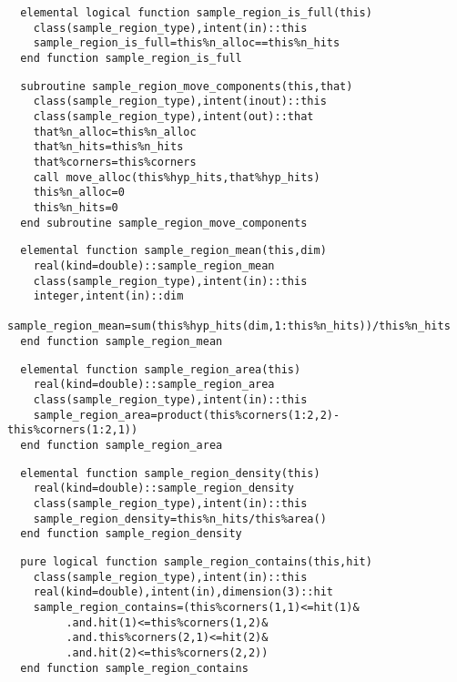 \begin{Verbatim}
  elemental logical function sample_region_is_full(this)
    class(sample_region_type),intent(in)::this
    sample_region_is_full=this%n_alloc==this%n_hits
  end function sample_region_is_full
\end{Verbatim}
  
\begin{Verbatim}
  subroutine sample_region_move_components(this,that)
    class(sample_region_type),intent(inout)::this
    class(sample_region_type),intent(out)::that
    that%n_alloc=this%n_alloc
    that%n_hits=this%n_hits
    that%corners=this%corners
    call move_alloc(this%hyp_hits,that%hyp_hits)
    this%n_alloc=0
    this%n_hits=0
  end subroutine sample_region_move_components
\end{Verbatim}

\begin{Verbatim}
  elemental function sample_region_mean(this,dim)
    real(kind=double)::sample_region_mean
    class(sample_region_type),intent(in)::this
    integer,intent(in)::dim
    sample_region_mean=sum(this%hyp_hits(dim,1:this%n_hits))/this%n_hits
  end function sample_region_mean
\end{Verbatim}

\begin{Verbatim}
  elemental function sample_region_area(this)
    real(kind=double)::sample_region_area
    class(sample_region_type),intent(in)::this
    sample_region_area=product(this%corners(1:2,2)-this%corners(1:2,1))
  end function sample_region_area
\end{Verbatim}

\begin{Verbatim}
  elemental function sample_region_density(this)
    real(kind=double)::sample_region_density
    class(sample_region_type),intent(in)::this
    sample_region_density=this%n_hits/this%area()
  end function sample_region_density
\end{Verbatim}

\begin{Verbatim}
  pure logical function sample_region_contains(this,hit)
    class(sample_region_type),intent(in)::this
    real(kind=double),intent(in),dimension(3)::hit
    sample_region_contains=(this%corners(1,1)<=hit(1)&
         .and.hit(1)<=this%corners(1,2)&
         .and.this%corners(2,1)<=hit(2)&
         .and.hit(2)<=this%corners(2,2))
  end function sample_region_contains
\end{Verbatim}

